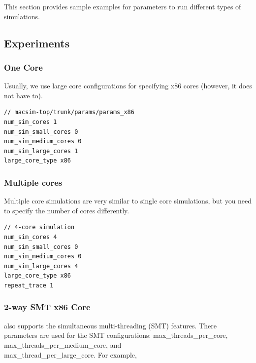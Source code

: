 This section provides sample examples for parameters to run different
types of simulations.



\subsection{\cpu Experiments}

\subsubsection{One \cpu Core}

Usually, we use large core configurations for specifying x86 cores
(however, it does not have to).

\begin{Verbatim}
// macsim-top/trunk/params/params_x86
num_sim_cores 1
num_sim_small_cores 0
num_sim_medium_cores 0
num_sim_large_cores 1
large_core_type x86
\end{Verbatim}


\subsubsection{Multiple \cpu cores}

Multiple core simulations are very similar to single core simulations,
but you need to specify the number of cores differently.


\begin{Verbatim}
// 4-core simulation
num_sim_cores 4
num_sim_small_cores 0
num_sim_medium_cores 0
num_sim_large_cores 4
large_core_type x86
repeat_trace 1
\end{Verbatim}



\subsubsection{2-way SMT x86 Core}

\SIM also supports the simultaneous multi-threading (SMT) features. 
There parameters are used for the SMT configurations: 
\textsf{max\_threads\_per\_core}, \textsf{max\_threads\_per\_medium\_core}, 
and \\\textsf{max\_thread\_per\_large\_core}. For example,


